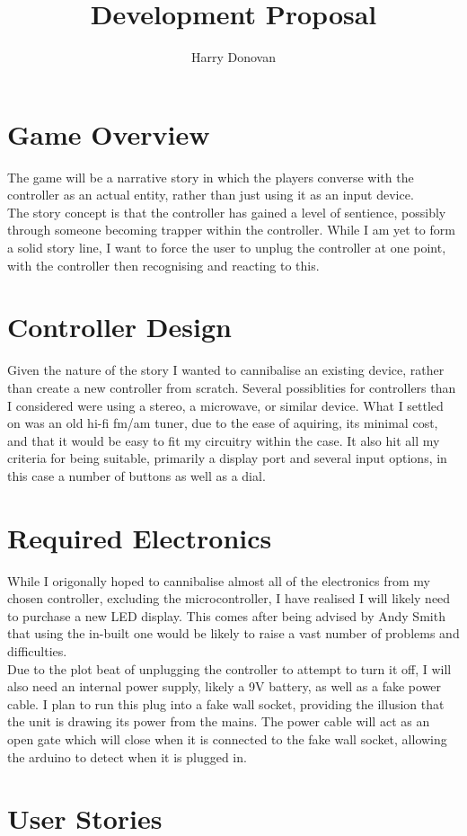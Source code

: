 \documentclass{article}
\begin{document}
\title{Development Proposal}
\author{Harry Donovan}
\date{}

\maketitle

\section{Game Overview}
The game will be a narrative story in which the players converse with the controller as an actual entity, rather than just using it as an input device. \\
The story concept is that the controller has gained a level of sentience, possibly through someone becoming trapper within the controller. While I am yet to form a solid story line, I want to force the user to unplug the controller at one point, with the controller then recognising and reacting to this.

\section{Controller Design}
Given the nature of the story I wanted to cannibalise an existing device, rather than create a new controller from scratch. Several possiblities for controllers than I considered were using a stereo, a microwave, or similar device. What I settled on was an old hi-fi fm/am tuner, due to the ease of aquiring, its minimal cost, and that it would be easy to fit my circuitry within the case. It also hit all my criteria for being suitable, primarily a display port and several input options, in this case a number of buttons as well as a dial.

\section{Required Electronics}
While I origonally hoped to cannibalise almost all of the electronics from my chosen controller, excluding the microcontroller, I have realised I will likely need to purchase a new LED display. This comes after being advised by Andy Smith that using the in-built one would be likely to raise a vast number of problems and difficulties. \\
Due to the plot beat of unplugging the controller to attempt to turn it off, I will also need an internal power supply, likely a 9V battery, as well as a fake power cable. I plan to run this plug into a fake wall socket, providing the illusion that the unit is drawing its power from the mains. The power cable will act as an open gate which will close when it is connected to the fake wall socket, allowing the arduino to detect when it is plugged in.

\section{User Stories}
\end{document}
